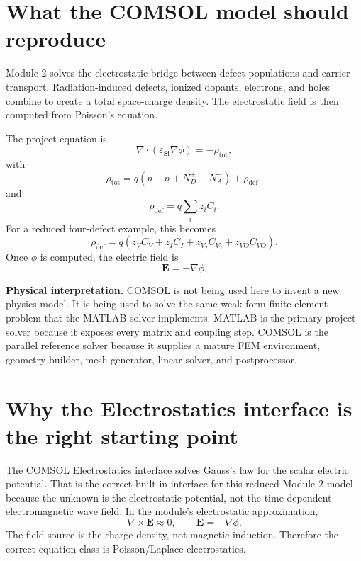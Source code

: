\documentclass[11pt]{article}
\newcommand{\Evec}{\mathbf{E}}
\newcommand{\epss}{\varepsilon_{\mathrm{Si}}}
\newcommand{\rhodef}{\rho_{\mathrm{def}}}
\newcommand{\rhotot}{\rho_{\mathrm{tot}}}
\begin{document}
\section{What the COMSOL model should reproduce}

Module 2 solves the electrostatic bridge between defect populations and carrier transport. Radiation-induced defects, ionized dopants, electrons, and holes combine to create a total space-charge density. The electrostatic field is then computed from Poisson's equation.

The project equation is
\begin{equation}
\nabla\cdot\left(\epss\nabla\phi\right)=-\rhotot,
\label{eq:poisson_project}
\end{equation}
with
\begin{equation}
\rhotot=q\left(p-n+N_D^+-N_A^-\right)+\rhodef,
\label{eq:rho_total}
\end{equation}
and
\begin{equation}
\rhodef=q\sum_i z_i C_i.
\label{eq:rho_def_general}
\end{equation}
For a reduced four-defect example, this becomes
\begin{equation}
\rhodef=q\left(z_V C_V+z_I C_I+z_{V_2}C_{V_2}+z_{VO}C_{VO}\right).
\label{eq:rho_def_four}
\end{equation}
Once $\phi$ is computed, the electric field is
\begin{equation}
\Evec=-\nabla\phi.
\label{eq:E_from_phi}
\end{equation}

\begin{physicsbox}
\textbf{Physical interpretation.} COMSOL is not being used here to invent a new physics model. It is being used to solve the same weak-form finite-element problem that the MATLAB solver implements. MATLAB is the primary project solver because it exposes every matrix and coupling step. COMSOL is the parallel reference solver because it supplies a mature FEM environment, geometry builder, mesh generator, linear solver, and postprocessor.
\end{physicsbox}

\section{Why the Electrostatics interface is the right starting point}

The COMSOL Electrostatics interface solves Gauss's law for the scalar electric potential. That is the correct built-in interface for this reduced Module 2 model because the unknown is the electrostatic potential, not the time-dependent electromagnetic wave field. In the module's electrostatic approximation,
\begin{equation}
\nabla\times\Evec\approx 0,\qquad \Evec=-\nabla\phi.
\end{equation}
The field source is the charge density, not magnetic induction. Therefore the correct equation class is Poisson/Laplace electrostatics.
\end{document}
